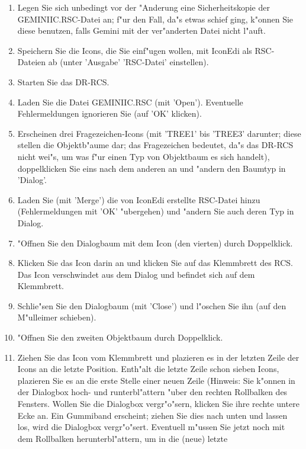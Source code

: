 \begin{enumerate}
 \item Legen Sie sich unbedingt vor der "Anderung eine 
       Sicherheitskopie der GEMINIIC.RSC-Datei an; f"ur den Fall, 
       da"s etwas schief ging, k"onnen Sie diese benutzen, falls 
       Gemini mit der ver"anderten Datei nicht l"auft.
 \item Speichern Sie die Icons, die Sie einf"ugen wollen, mit
       IconEdi als RSC-Dateien ab (unter 'Ausgabe' 'RSC-Datei'
       einstellen).
 \item Starten Sie das DR-RCS.
 \item Laden Sie die Datei GEMINIIC.RSC (mit 'Open').
       Eventuelle Fehlermeldungen ignorieren Sie (auf 'OK' klicken).
 \item Erscheinen drei Fragezeichen-Icons (mit 'TREE1' bis
       'TREE3' darunter; diese stellen die Objektb"aume dar; das 
       Fragezeichen bedeutet, da"s das DR-RCS nicht wei"s, um was f"ur 
       einen Typ von Objektbaum es sich handelt), doppelklicken Sie 
       eins nach dem anderen an und "andern den Baumtyp in 'Dialog'.
 \item Laden Sie (mit 'Merge') die von IconEdi erstellte RSC-Datei
       hinzu (Fehlermeldungen mit 'OK' "ubergehen) 
       und "andern Sie auch deren Typ in Dialog.
 \item "Offnen Sie den Dialogbaum mit dem Icon (den vierten) durch 
       Doppelklick.
 \item Klicken Sie das Icon darin an und klicken Sie auf das 
       Klemmbrett des RCS. Das Icon verschwindet aus dem Dialog
       und befindet sich auf dem Klemmbrett.
 \item Schlie"sen Sie den Dialogbaum (mit 'Close') und l"oschen Sie
       ihn (auf den M"ulleimer schieben).
 \item "Offnen Sie den zweiten Objektbaum durch Doppelklick.
 \item Ziehen Sie das Icon vom Klemmbrett und plazieren es in der
       letzten Zeile der Icons an die letzte Position. Enth"alt die 
       letzte Zeile schon sieben Icons, plazieren Sie es an die
       erste Stelle einer neuen Zeile (Hinweis: Sie k"onnen in der 
       Dialogbox hoch- und runterbl"attern "uber den rechten 
       Rollbalken des Fensters. Wollen Sie die Dialogbox vergr"o"sern,
       klicken Sie ihre rechte untere Ecke an. Ein Gummiband 
       erscheint; ziehen Sie dies nach unten und lassen los, wird
       die Dialogbox vergr"o"sert. Eventuell m"ussen Sie jetzt noch mit
       dem Rollbalken herunterbl"attern, um in die (neue) letzte 

\end{enumerate}
